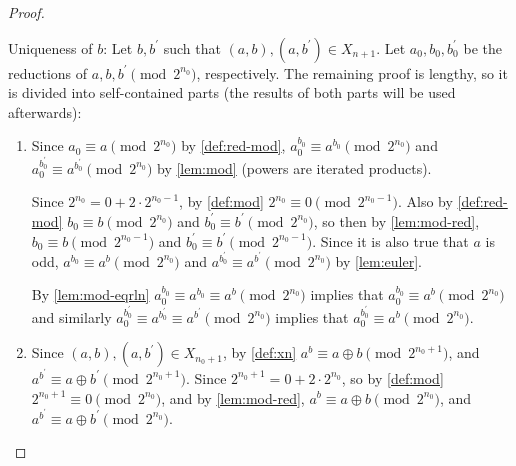 \documentclass[1gpt]{article}
\theoremstyle{break}
\newcommand{\xor}{\oplus}
\begin{document}
\begin{proof}
\begin{enumerate}
\begin{enumerate}
            \end{enumerate}

            Uniqueness of $b$: Let $b, b^\prime$ such that $(a, b), (a,
            b^\prime) \in X_{n+1}$.
            Let $a_0, b_0, b^\prime_0$ be the reductions of $a, b, b^\prime
            \pmod{2^{n_0}}$, respectively. The remaining proof is lengthy, so
            it is divided into self-contained parts (the results of both parts
            will be used afterwards):

            \begin{enumerate}

                \item

                    Since $a_0 \equiv a \pmod{2^{n_0}}$ by \ref{def:red-mod},
                    $a_0^{b_0} \equiv a^{b_0} \pmod{2^{n_0}}$ and
                    $a_0^{b^\prime_0} \equiv a^{b^\prime_0} \pmod{2^{n_0}}$ by
                    \ref{lem:mod} (powers are iterated products). 

                    Since $2^{n_0} = 0 + 2 \cdot{2^{n_0 - 1}}$, by
                    \ref{def:mod} $2^{n_0} \equiv 0 \pmod{2^{n_0 - 1}}$. Also
                    by \ref{def:red-mod} $b_0 \equiv b \pmod{2^{n_0}}$ and
                    $b^\prime_0 \equiv b^\prime \pmod{2^{n_0}}$, so then by
                    \ref{lem:mod-red}, $b_0 \equiv b \pmod{2^{n_0-1}}$ and
                    $b^\prime_0 \equiv b^\prime \pmod{2^{n_0-1}}$. Since it is
                    also true that $a$ is odd, $a^{b_0} \equiv a^b
                    \pmod{2^{n_0}}$ and $a^{b^\prime_0} \equiv a^{b^\prime}
                    \pmod{2^{n_0}}$ by \ref{lem:euler}.

                    By \ref{lem:mod-eqrln} $a_0^{b_0} \equiv a^{b_0} \equiv a^b
                    \pmod{2^{n_0}}$ implies that $a_0^{b_0} \equiv a^b
                    \pmod{2^{n_0}}$ and similarly $a_0^{b^\prime_0} \equiv
                    a^{b^\prime_0} \equiv a^{b^\prime} \pmod{2^{n_0}}$ implies
                    that $a_0^{b^\prime_0} \equiv a^b \pmod{2^{n_0}}$.

                \item
                    Since $(a, b), (a, b^\prime) \in X_{n_0+1}$, by
                    \ref{def:xn} $a^b \equiv a \xor b \pmod{2^{n_0+1}}$, and
                    $a^{b^\prime} \equiv a \xor b^\prime \pmod{2^{n_0+1}}$.
                    Since $2^{n_0+1} = 0 + 2 \cdot 2^{n_0}$, so by
                    \ref{def:mod} $2^{n_0+1} \equiv 0 \pmod{2^{n_0}}$, and by
                    \ref{lem:mod-red}, $a^b \equiv a \xor b \pmod{2^{n_0}}$,
                    and $a^{b^\prime} \equiv a \xor b^\prime \pmod{2^{n_0}}$.


\end{enumerate}
\end{enumerate}
\end{proof}
\end{document}
